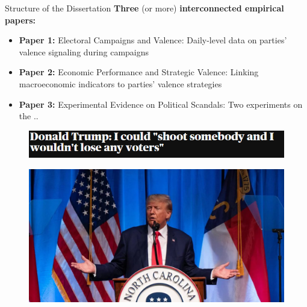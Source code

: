 \documentclass[9pt, aspectratio=169]{beamer}
\begin{document}
\begin{frame}{Structure of the Dissertation}
        \textbf{Three} (or more) \textbf{interconnected empirical papers:} \vspace{0.2cm}
        \begin{itemize}
            \item \textbf{Paper 1:} Electoral Campaigns and Valence:  Daily-level data on parties’ valence signaling during campaigns \vspace{0.1cm}
            \item \textbf{Paper 2:} Economic Performance and Strategic Valence: Linking macroeconomic indicators to parties' valence strategies \vspace{0.1cm}
            \item \textbf{Paper 3:} Experimental Evidence on Political Scandals: Two experiments on the .. 
        \end{itemize}
    
\end{frame}


\begin{frame} %
    \begin{figure}
        \centering
        \includegraphics[width=\linewidth]{images/Trump1.png}
        \label{fig:trump1}
    \end{figure}
        \begin{figure}
        \centering
        \includegraphics[width=0.7\linewidth]{images/Trump2.jpg}
        \label{fig:trump2}
    \end{figure}
\end{frame}
\end{document}
